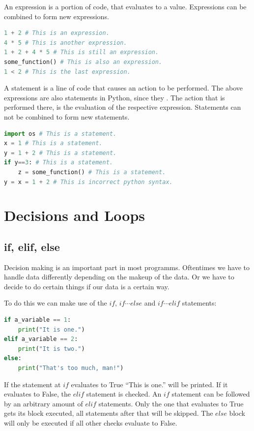 \documentclass{article}
\begin{document}
An expression is a portion of code, that evaluates to a value.
Expressions can be combined to form new expressions.
\begin{lstlisting}[language=Python]
1 + 2 # This is an expression.
4 * 5 # This is another expression.
1 + 2 + 4 * 5 # This is still an expression.
some_function() # This is also an expression.
1 < 2 # This is the last expression.
\end{lstlisting}

A statement is a line of code that causes an action to be performed.
The above expressions are also statements in Python, since they .
The action that is performed there, is the evaluation of the respective expression.
Statements can not be combined to form new statements.

\begin{lstlisting}[language=Python]
import os # This is a statement.
x = 1 # This is a statement.
y = 1 + 2 # This is a statement.
if y==3: # This is a statement.
    z = some_function() # This is a statement. 
y = x = 1 + 2 # This is incorrect python syntax.
\end{lstlisting}


\section{Decisions and Loops}

\subsection{if, elif, else}

Decision making is an important part in most programms.
Oftentimes we have to handle data differently depending on
the makeup of the data.
Or we have to decide to do certain things if our data is a certain way.

To do this we can make use of the $if$, $if\cdots else$ and $if\cdots elif$
statements:

\begin{lstlisting}[language=Python]
if a_variable == 1:
    print("It is one.")
elif a_variable == 2:
    print("It is two.")
else:
    print("That's too much, man!")
\end{lstlisting}

If the statement at $if$ evaluates to True ``This is one.'' will be printed.
If it evaluates to False, the $elif$ statement is checked.
An $if$ statement can be followed by an arbitrary amount of $elif$ statements.
Only the one that evaluates to True gets its block executed, all statements
after that will be skipped.
The $else$ block will only be executed if all other checks evaluate to False.
\end{document}
